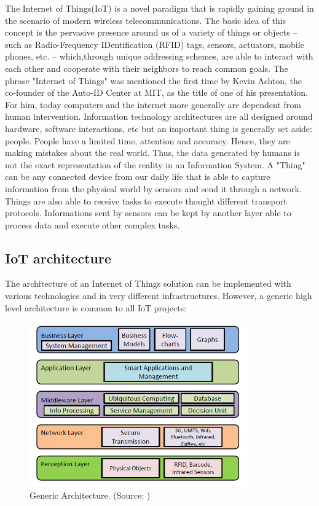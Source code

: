 \documentclass[11pt]{article}
\begin{document}
The Internet of Things(IoT) is a novel paradigm that is rapidly gaining ground in the scenario of modern wireless telecommunications. The basic idea of this concept is the pervasive presence around us of a variety of things or objects – such as Radio-Frequency IDentification (RFID) tags, sensors, actuators, mobile phones, etc. – which,through unique addressing schemes, are able to interact with each other and cooperate with their neighbors to reach common goals. \cite{2}
\newline
\newline
The phrase "Internet of Things" was mentioned the first time by Kevin Ashton, the co-founder of the Auto-ID Center at MIT, as the title of one of his presentation. For him, today computers and the internet more generally are dependent from human intervention. Information technology architectures are all designed around hardware, software interactions, etc but an important thing is generally set aside: people. People have a limited time, attention and accuracy. Hence, they are making mistakes about the real world. Thus, the data generated by humans is not the exact representation of the reality in an Information System.
\newline
\newline
A "Thing" can be any connected device from our daily life that is able to capture information from the physical world by sensors and send it through a network. Things are also able to receive tasks to execute thought different transport protocols. Informations sent by sensors can be kept by another layer able to process data and execute other complex tasks. 

\subsection{IoT architecture}

The architecture of an Internet of Things solution can be implemented with various technologies and in very different infrastructures. However, a generic high level architecture is common to all IoT projects:
\begin{figure}[H]
	\includegraphics[width=\textwidth,height=200pt]{assets/Abstract_IoT_Architecture.png} 
	\caption[Generic Architecture]{Generic Architecture. (Source: \cite{Future-Internet-The-Internet-of-Things})}
	\label{fig:genericArchitecture}
\end{figure}
\end{document}
